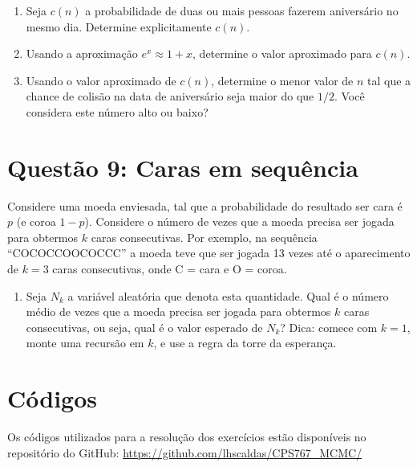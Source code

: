 \documentclass[12 pt]{article}
\begin{document}
\begin{enumerate}
    \item Seja $c(n)$ a probabilidade de duas ou mais pessoas fazerem aniversário no mesmo dia. Determine explicitamente $c(n)$.
    \begin{tcolorbox}[colframe=black, title=Resposta:]
    


    \end{tcolorbox}
    \item Usando a aproximação $e^x \approx 1 + x$, determine o valor aproximado para $c(n)$.
    \begin{tcolorbox}[colframe=black, title=Resposta:]

    \end{tcolorbox}
    \item Usando o valor aproximado de $c(n)$, determine o menor valor de $n$ tal que a chance de colisão na data de aniversário seja maior do que $1/2$. Você considera este número alto ou baixo?
    \begin{tcolorbox}[colframe=black, title=Resposta:]

    \end{tcolorbox}
\end{enumerate}

\section*{Questão 9: Caras em sequência}
Considere uma moeda enviesada, tal que a probabilidade do resultado ser cara é $p$ (e coroa $1 - p$).
Considere o número de vezes que a moeda precisa ser jogada para obtermos $k$ caras consecutivas. Por exemplo, na sequência ``COCOCCOOCOCCC'' a moeda teve que ser jogada 13 vezes até o aparecimento de $k = 3$ caras consecutivas, onde C = cara e O = coroa.


\begin{enumerate}
    \item Seja $N_k$ a variável aleatória que denota esta quantidade. Qual é o número médio de vezes que a moeda precisa ser jogada para obtermos $k$ caras consecutivas, ou seja, qual é o valor esperado de $N_k$? Dica: comece com $k = 1$, monte uma recursão em $k$, e use a regra da torre da esperança.
    \begin{tcolorbox}[colframe=black, title=Resposta:]

    \end{tcolorbox}
\end{enumerate}

\section*{Códigos}

Os códigos utilizados para a resolução dos exercícios estão disponíveis no repositório do GitHub: \url{https://github.com/lhscaldas/CPS767_MCMC/}

\end{document}
